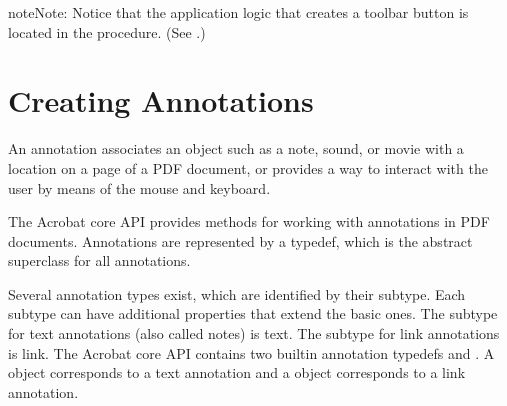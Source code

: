 \documentclass[letterpaper,12pt,english,openany,oneside]{sphinxmanual}
\begin{document}
\begin{sphinxVerbatim}[commandchars=\\\{\}]
  
      

   

    

       
    
    
    
    
\end{sphinxVerbatim}

\begin{sphinxadmonition}{note}{Note:}
Notice that the application logic that creates a toolbar button is located in the  procedure. (See .)
\end{sphinxadmonition}


\chapter{Creating Annotations}
\label{\detokenize{Plugins_Annotations:creating-annotations}}\label{\detokenize{Plugins_Annotations::doc}}
An annotation associates an object such as a note, sound, or movie with a location on a page of a PDF document, or provides a way to interact with the user by means of the mouse and keyboard.

The Acrobat core API provides methods for working with annotations in PDF documents. Annotations are represented by a  typedef, which is the abstract superclass for all annotations.

Several annotation types exist, which are identified by their subtype. Each subtype can have additional properties that extend the basic ones. The subtype for text annotations (also called notes) is text. The subtype for link annotations is link. The Acrobat core API contains two built\sphinxhyphen{}in annotation typedefs  and . A  object corresponds to a text annotation and a  object corresponds to a link annotation.
\end{document}

